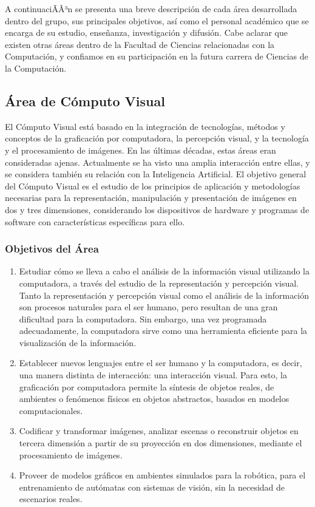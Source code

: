 A continuaciÃÂ³n se presenta una breve descripci\'on de cada \'area desarrollada dentro del grupo, sus principales objetivos, as\'i como el personal acad\'emico que se encarga de su estudio, ense\~nanza, investigaci\'on y difusi\'on. Cabe aclarar que existen otras \'areas dentro de la Facultad de Ciencias relacionadas con la Computaci\'on, y confiamos en su participaci\'on en la futura carrera de Ciencias de la Computaci\'on.


\subsection{\'Area de C\'omputo Visual}

El C\'omputo Visual est\'a basado en la integraci\'on de tecnolog\'ias, m\'etodos y conceptos de la graficaci\'on por computadora, la percepci\'on visual, y la tecnolog\'ia y el procesamiento de im\'agenes. En las \'ultimas d\'ecadas, estas \'areas eran consideradas ajenas. Actualmente se ha visto una amplia interacci\'on entre ellas, y se considera tambi\'en su relaci\'on con la Inteligencia Artificial. El objetivo general del C\'omputo Visual es el estudio de los principios de aplicaci\'on y metodolog\'ias necesarias para la representaci\'on, manipulaci\'on y presentaci\'on de im\'agenes en dos y tres dimensiones, considerando los dispositivos de hardware y programas de software con caracter\'isticas
espec\'ificas para ello.

\subsubsection{Objetivos del \'Area}

\begin{enumerate}
\item Estudiar c\'omo se lleva a cabo el an\'alisis de la informaci\'on visual utilizando la computadora, a trav\'es del estudio de la representaci\'on y percepci\'on visual. Tanto la representaci\'on y percepci\'on visual como el an\'alisis de la informaci\'on son procesos naturales para el ser humano, pero resultan de una gran dificultad para la computadora. Sin embargo, una vez programada adecuadamente, la computadora sirve como una herramienta eficiente para la visualizaci\'on de la informaci\'on.

\item Establecer nuevos lenguajes entre el ser humano y la computadora, es decir, una manera distinta de interacci\'on: una interacci\'on visual. Para esto, la graficaci\'on por computadora permite la s\'intesis de objetos reales, de ambientes o fen\'omenos f\'isicos en objetos abstractos, basados en modelos computacionales.

\item Codificar y transformar im\'agenes, analizar escenas o reconstruir objetos en tercera dimensi\'on a partir de su proyecci\'on en dos dimensiones, mediante el procesamiento de im\'agenes.

\item Proveer de modelos gr\'aficos en ambientes simulados para la rob\'otica, para el entrenamiento de aut\'omatas con sistemas de visi\'on, sin la necesidad de escenarios reales.
\end{enumerate}

